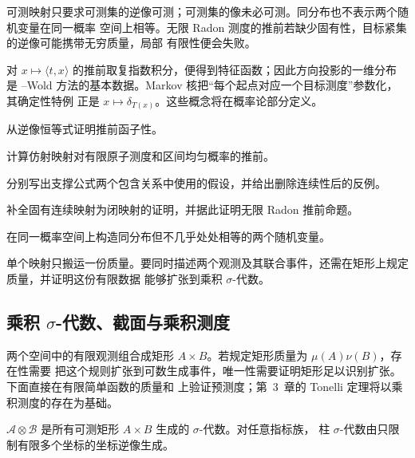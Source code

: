 \begin{remark}
可测映射只要求可测集的逆像可测；可测集的像未必可测。同分布也不表示两个随机变量在同一概率
空间上相等。无限 Radon 测度的推前若缺少固有性，目标紧集的逆像可能携带无穷质量，局部
有限性便会失败。
\end{remark}

对 \(x\mapsto\langle t,x\rangle\) 的推前取复指数积分，便得到特征函数；因此方向投影的一维分布
是 \Cramer{}--Wold 方法的基本数据。Markov 核把“每个起点对应一个目标测度”参数化，其确定性特例
正是 \(x\mapsto\delta_{T(x)}\)。这些概念将在概率论部分定义。

\begin{exercise}
从逆像恒等式证明推前函子性。
\end{exercise}
\begin{exercise}
计算仿射映射对有限原子测度和区间均匀概率的推前。
\end{exercise}
\begin{exercise}
分别写出支撑公式两个包含关系中使用的假设，并给出删除连续性后的反例。
\end{exercise}
\begin{exercise}
补全固有连续映射为闭映射的证明，并据此证明无限 Radon 推前命题。
\end{exercise}
\begin{exercise}
在同一概率空间上构造同分布但不几乎处处相等的两个随机变量。
\end{exercise}

单个映射只搬运一份质量。要同时描述两个观测及其联合事件，还需在矩形上规定质量，并证明这份有限数据
能够扩张到乘积 $\sigma$-代数。

\subsection{乘积 \texorpdfstring{$\sigma$}{sigma}-代数、截面与乘积测度}\label{subsec:2-3-2}

两个空间中的有限观测组合成矩形 $A\times B$。若规定矩形质量为 $\mu(A)\nu(B)$，存在性需要
把这个规则扩张到可数生成事件，唯一性需要证明矩形足以识别扩张。下面直接在有限简单函数的质量和
上验证预测度；第~3~章的 Tonelli 定理将以乘积测度的存在为基础。

\begin{definition}[乘积 $\sigma$-代数]\label{def:2-3-2-1}
$\mathcal A\otimes\mathcal B$ 是所有可测矩形 $A\times B$ 生成的 $\sigma$-代数。对任意指标族，
柱 $\sigma$-代数由只限制有限多个坐标的坐标逆像生成。
\end{definition}

